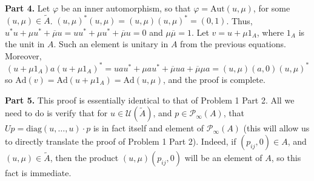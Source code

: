 \documentclass[aps,pra,showpacs,notitlepage,onecolumn,superscriptaddress,nofootinbib]{revtex4-1}
\newcommand{\hhrulefill}{\hspace{-1.0em}\hrulefill}
\theoremstyle{definition}
\begin{document}
\noindent \textbf{Part 4.} Let $\varphi$ be an inner automorphism, so that $\varphi = \text{Aut}(u, \mu)$, for some $(u, \mu) \in \widetilde{A}$. $(u, \mu)^{*} (u, \mu) = (u, \mu) (u, \mu)^{*} = (0, 1)$.
Thus, $u^{*} u + \mu u^{*} + \overline{\mu} u = u u^{*} +  \mu u^{*} + \overline{\mu} u = 0$ and $\mu \overline{\mu} = 1$. Let $v = u + \mu 1_{A}$, where $1_A$ is the unit in $A$. Such an element
is unitary in $A$ from the previous equations. Moreover,
\begin{equation}
  (u + \mu 1_A) a (u + \mu 1_A)^{*} = u a u^{*} + \mu a u^{*} + \overline{\mu} u a + \overline{\mu} \mu a = (u, \mu) (a, 0) (u, \mu)^{*}
\end{equation}
so $\text{Ad}(v) = \text{Ad}(u + \mu 1_A) = \text{Ad}(u, \mu)$, and the proof is complete.
\newline

\noindent \textbf{Part 5.} This proof is essentially identical to that of Problem 1 Part 2. All we need to do is verify that for $u \in \mathcal{U}(\widetilde{A})$, and $p \in \mathcal{P}_{\infty}(A)$,
that $U p = \text{diag}(u, \dots, u) \cdot p$ is in fact itself and element of $\mathcal{P}_{\infty}(A)$ (this will allow us to directly translate the proof of Problem 1 Part 2). Indeed, if $(p_{ij}, 0) \in A$,
and $(u, \mu) \in \widetilde{A}$, then the product $(u, \mu) (p_{ij}, 0)$ will be an element of $A$, so this fact is immediate.

\hhrulefill
\end{document}
